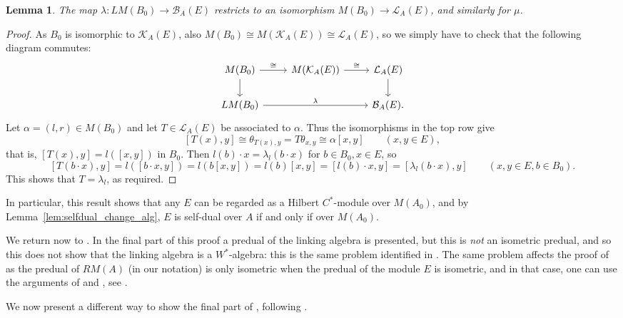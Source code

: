 \documentclass[a4paper,11pt]{article}
\theoremstyle{plain}
\newtheorem{lemma}[proposition]{Lemma}
\theoremstyle{remark}
\newcommand{\mc}[1]{\mathcal{#1}}
\begin{document}
\begin{lemma}\label{lem:mults_are_adjointables}
The map $\lambda \colon LM(B_0) \to \mc B_A(E)$ restricts to an isomorphism $M(B_0) \to \mc L_A(E)$, and similarly for $\mu$.
\end{lemma}
\begin{proof}
As $B_0$ is isomorphic to $\mc K_A(E)$, also $M(B_0) \cong M(\mc K_A(E)) \cong \mc L_A(E)$, so we simply have to check that the following diagram commutes:
\[ \begin{tikzcd}
  M(B_0) \ar[r, "\cong"] \ar[d] & M(\mc K_A(E)) \ar[r, "\cong"] & \mc L_A(E) \ar[d] \\
  LM(B_0) \ar[rr, "\lambda"] && \mc B_A(E).
\end{tikzcd} \]
Let $\alpha = (l,r) \in M(B_0)$ and let $T\in \mc L_A(E)$ be associated to $\alpha$.  Thus the isomorphisms in the top row give
\[ [T(x), y] \cong \theta_{T(x), y} = T\theta_{x,y} \cong \alpha [x,y] \qquad (x,y\in E), \]
that is, $[T(x), y] = l([x,y])$ in $B_0$.  Then $l(b)\cdot x = \lambda_l(b\cdot x)$ for $b\in B_0, x\in E$, so
\[ [T(b\cdot x), y] = l([b\cdot x, y]) = l(b [x,y]) = l(b) [x,y] = [l(b)\cdot x, y] = [\lambda_l(b\cdot x), y]
\qquad (x,y\in E, b\in B_0). \]
This shows that $T = \lambda_l$, as required.
\end{proof}

In particular, this result shows that any $E$ can be regarded as a Hilbert $C^*$-module over $M(A_0)$, and by Lemma~\ref{lem:selfdual_change_alg}, $E$ is self-dual over $A$ if and only if over $M(A_0)$.

We return now to \cite[Theorem~2.6]{Schweizer_HilbModsPredual}.  In the final part of this proof a predual of the linking algebra is presented, but this is \emph{not} an isometric predual, and so this does not show that the linking algebra is a $W^*$-algebra: this is the same problem identified in \cite{new_paper}.  The same problem affects the proof of \cite[Theorem~2.8]{Schweizer_HilbModsPredual} as the predual of $RM(A)$ (in our notation) is only isometric when the predual of the module $E$ is isometric, and in that case, one can use the arguments of \cite{BM_Duality_OpAlgI} and \cite{EOR_InjectivityNuclearityOS}, see \cite[??]{new_paper}.

We now present a different way to show the final part of \cite[Theorem~2.6]{Schweizer_HilbModsPredual}, following \cite{new_paper}.
\end{document}
